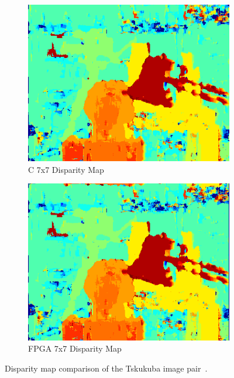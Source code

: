 \begin{figure}
\begin{center}
\begin{subfigure}{0.45\textwidth}
		\includegraphics[width=\textwidth]{figures/tsukuba_c_7x7.png}
		\caption{C 7x7 Disparity Map}
		\label{fig:tsukubaC7x7}
	\end{subfigure}
	\begin{subfigure}{0.45\textwidth}
		\includegraphics[width=\textwidth]{figures/tsukuba_7x7_fpga.png}
		\caption{FPGA 7x7 Disparity Map}
		\label{fig:tsukubaFPGA7x7}
	\end{subfigure}
	\captionfonts
	\caption{Disparity map comparison of the Tskukuba image pair~\cite{middlebury}.}
	\label{fig:tsukubaDispMap}
\end{center}
\end{figure}

